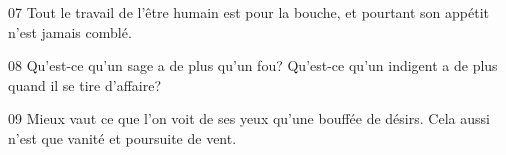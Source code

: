 
07 Tout le travail de l’être humain est pour la bouche, et pourtant son appétit n’est jamais comblé.

08 Qu’est-ce qu’un sage a de plus qu’un fou? Qu’est-ce qu’un indigent a de plus quand il se tire d’affaire?

09 Mieux vaut ce que l’on voit de ses yeux qu’une bouffée de désirs. Cela aussi n’est que vanité et poursuite de vent.
